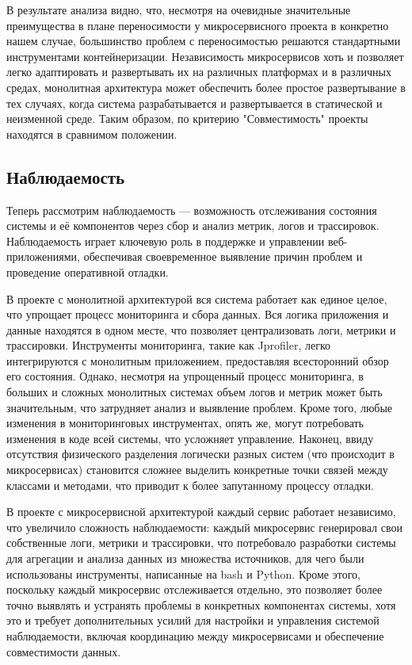    В результате анализа видно, что, несмотря на очевидные значительные преимущества в плане переносимости у микросервисного проекта в конкретно нашем случае, большинство проблем с переносимостью решаются стандартными инструментами контейнеризации. Независимость микросервисов хоть и позволяет легко адаптировать и развертывать их на различных платформах и в различных средах, монолитная архитектура может обеспечить более простое развертывание в тех случаях, когда система разрабатывается и развертывается в статической и неизменной среде.  Таким образом, по критерию "Совместимость" проекты находятся в сравнимом положении.

\subsection{Наблюдаемость}
    Теперь рассмотрим наблюдаемость — возможность отслеживания состояния системы и её компонентов через сбор и анализ метрик, логов и трассировок. Наблюдаемость играет ключевую роль в поддержке и управлении веб-приложениями, обеспечивая своевременное выявление причин проблем и проведение оперативной отладки.
    
    В проекте с монолитной архитектурой вся система работает как единое целое, что упрощает процесс мониторинга и сбора данных. Вся логика приложения и данные находятся в одном месте, что позволяет централизовать логи, метрики и трассировки. Инструменты мониторинга, такие как Jprofiler, легко интегрируются с монолитным приложением, предоставляя всесторонний обзор его состояния. Однако, несмотря на упрощенный процесс мониторинга, в больших и сложных монолитных системах объем логов и метрик может быть значительным, что затрудняет анализ и выявление проблем. Кроме того, любые изменения в мониторинговых инструментах, опять же, могут потребовать изменения в коде всей системы, что усложняет управление. Наконец, ввиду отсутствия физического разделения логически разных систем (что происходит в микросервисах) становится сложнее выделить конкретные точки связей между классами и методами, что приводит к более запутанному процессу отладки.
    
    В проекте с микросервисной архитектурой каждый сервис работает независимо, что увеличило сложность наблюдаемости: каждый микросервис генерировал свои собственные логи, метрики и трассировки, что потребовало разработки системы для агрегации и анализа данных из множества источников, для чего были использованы инструменты, написанные на bash и Python. Кроме этого, поскольку каждый микросервис отслеживается отдельно, это позволяет более точно выявлять и устранять проблемы в конкретных компонентах системы, хотя это и требует дополнительных усилий для настройки и управления системой наблюдаемости, включая координацию между микросервисами и обеспечение совместимости данных.
    
